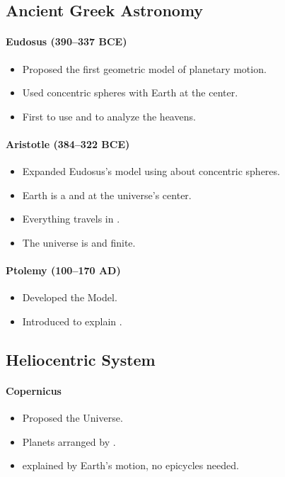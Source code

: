 \documentclass[12pt]{article}
\newcommand{\fillin}[1]{\uline{\hspace{#1}}}
\begin{document}
\subsection*{Ancient Greek Astronomy}
\paragraph{Eudosus (390–337 BCE)}
\begin{itemize}
  \item Proposed the first geometric model of planetary motion.
  \item Used \fillin{2cm} concentric spheres with Earth at the center.
  \item First to use \fillin{3cm} and \fillin{3cm} to analyze the heavens.
\end{itemize}

\paragraph{Aristotle (384–322 BCE)}
\begin{itemize}
  \item Expanded Eudosus's model using about \fillin{2cm} concentric spheres.
  \item Earth is a \fillin{2cm} and \fillin{2.5cm} at the universe's center.
  \item Everything travels in \fillin{3cm}.
  \item The universe is \fillin{3cm} and finite.
\end{itemize}

\paragraph{Ptolemy (100–170 AD)}
\begin{itemize}
  \item Developed the \fillin{3cm} Model.
  \item Introduced \fillin{3cm} to explain \fillin{3cm}.
\end{itemize}

\subsection*{Heliocentric System}
\paragraph{Copernicus}
\begin{itemize}
  \item Proposed the \fillin{3cm} Universe.
  \item Planets arranged by \fillin{3cm}.
  \item \fillin{3cm} explained by Earth’s motion, no epicycles needed.
\end{itemize}
\end{document}
